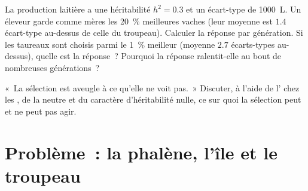 \begin{exercise}[$\star\star\star$]\label{exo:b2:population-genetics:11}
La production laitière a une héritabilité $h^{2} = 0.3$ et un écart-type de
\qty{1000}{L}. Un éleveur garde comme mères les \qty{20}{\%} meilleures
vaches (leur moyenne est $1.4$ écart-type au-dessus de celle du troupeau).
Calculer la réponse par génération. Si les taureaux sont choisis parmi le
\qty{1}{\%} meilleur (moyenne $2.7$ écarts-types au-dessus), quelle est
la réponse~? Pourquoi la réponse ralentit-elle au bout de nombreuses
générations~?
\end{exercise}

\begin{exercise}[$\star\star\star$]\label{exo:b2:population-genetics:12}
«~La sélection est aveugle à ce qu'elle ne voit pas.~» Discuter, à
l'aide de l'  chez les , de la 
neutre et du caractère d'héritabilité nulle, ce sur quoi la sélection
peut et ne peut pas agir.
\end{exercise}

\section{Problème~: la phalène, l'île et le troupeau}

